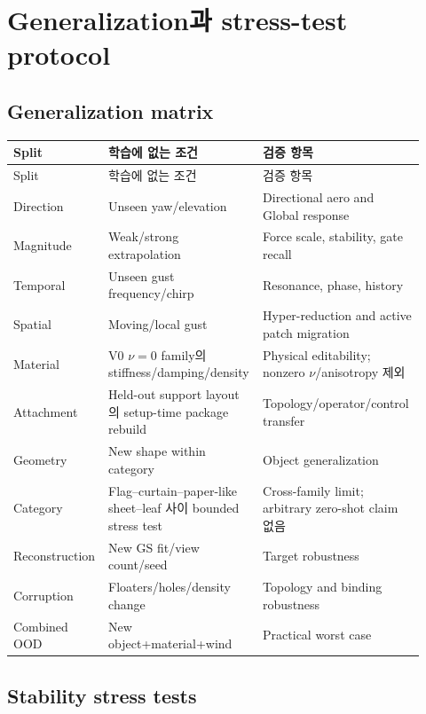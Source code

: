\documentclass[11pt,a4paper]{article}
\begin{document}
\section{Generalization과 stress-test protocol}

\subsection{Generalization matrix}

\begin{longtable}{L{0.22\linewidth}L{0.31\linewidth}L{0.39\linewidth}}
\toprule
Split & 학습에 없는 조건 & 검증 항목 \\
\midrule
\endfirsthead
\toprule
Split & 학습에 없는 조건 & 검증 항목 \\
\midrule
\endhead
Direction & Unseen yaw/elevation & Directional aero and Global response \\
\addlinespace
Magnitude & Weak/strong extrapolation & Force scale, stability, gate recall \\
\addlinespace
Temporal & Unseen gust frequency/chirp & Resonance, phase, history \\
\addlinespace
Spatial & Moving/local gust & Hyper-reduction and active patch migration \\
\addlinespace
Material & V0 \(\nu=0\) family의 stiffness/damping/density & Physical editability; nonzero \(\nu\)/anisotropy 제외 \\
\addlinespace
Attachment & Held-out support layout의 setup-time package rebuild & Topology/operator/control transfer \\
\addlinespace
Geometry & New shape within category & Object generalization \\
\addlinespace
Category & Flag--curtain--paper-like sheet--leaf 사이 bounded stress test & Cross-family limit; arbitrary zero-shot claim 없음 \\
\addlinespace
Reconstruction & New GS fit/view count/seed & Target robustness \\
\addlinespace
Corruption & Floaters/holes/density change & Topology and binding robustness \\
\addlinespace
Combined OOD & New object+material+wind & Practical worst case \\
\bottomrule
\end{longtable}

\subsection{Stability stress tests}
\end{document}
